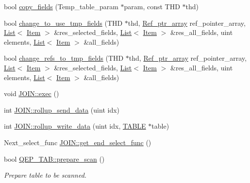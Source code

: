 \begin{DoxyCompactItemize}
\item 
bool \mbox{\hyperlink{group__Query__Executor_ga6ae2b33e35bb51f5250fac64ee0d231b}{copy\+\_\+fields}} (Temp\+\_\+table\+\_\+param $\ast$param, const T\+HD $\ast$thd)
\item 
bool \mbox{\hyperlink{group__Query__Executor_ga1e985adce1ee0b0c97f2351330ba0b45}{change\+\_\+to\+\_\+use\+\_\+tmp\+\_\+fields}} (T\+HD $\ast$thd, \mbox{\hyperlink{classBounds__checked__array}{Ref\+\_\+ptr\+\_\+array}} ref\+\_\+pointer\+\_\+array, \mbox{\hyperlink{classList}{List}}$<$ \mbox{\hyperlink{classItem}{Item}} $>$ \&res\+\_\+selected\+\_\+fields, \mbox{\hyperlink{classList}{List}}$<$ \mbox{\hyperlink{classItem}{Item}} $>$ \&res\+\_\+all\+\_\+fields, uint elements, \mbox{\hyperlink{classList}{List}}$<$ \mbox{\hyperlink{classItem}{Item}} $>$ \&all\+\_\+fields)
\item 
bool \mbox{\hyperlink{group__Query__Executor_gae27d7837289ad61f55a8649b343d2ffe}{change\+\_\+refs\+\_\+to\+\_\+tmp\+\_\+fields}} (T\+HD $\ast$thd, \mbox{\hyperlink{classBounds__checked__array}{Ref\+\_\+ptr\+\_\+array}} ref\+\_\+pointer\+\_\+array, \mbox{\hyperlink{classList}{List}}$<$ \mbox{\hyperlink{classItem}{Item}} $>$ \&res\+\_\+selected\+\_\+fields, \mbox{\hyperlink{classList}{List}}$<$ \mbox{\hyperlink{classItem}{Item}} $>$ \&res\+\_\+all\+\_\+fields, uint elements, \mbox{\hyperlink{classList}{List}}$<$ \mbox{\hyperlink{classItem}{Item}} $>$ \&all\+\_\+fields)
\item 
void \mbox{\hyperlink{group__Query__Executor_ga31581f58624b85919d7c6cd632157929}{J\+O\+I\+N\+::exec}} ()
\item 
int \mbox{\hyperlink{group__Query__Executor_ga148b2123bee3ebd0718d334e9f109db8}{J\+O\+I\+N\+::rollup\+\_\+send\+\_\+data}} (uint idx)
\item 
int \mbox{\hyperlink{group__Query__Executor_ga15c9baf548fef3d59f993a3c13575593}{J\+O\+I\+N\+::rollup\+\_\+write\+\_\+data}} (uint idx, \mbox{\hyperlink{structTABLE}{T\+A\+B\+LE}} $\ast$table)
\item 
Next\+\_\+select\+\_\+func \mbox{\hyperlink{group__Query__Executor_ga8a8f8266528e6e4f33f31333f5f3cd8a}{J\+O\+I\+N\+::get\+\_\+end\+\_\+select\+\_\+func}} ()
\item 
bool \mbox{\hyperlink{group__Query__Executor_ga0f7e9ff5a681a6bcc59e6e1f9af62b76}{Q\+E\+P\+\_\+\+T\+A\+B\+::prepare\+\_\+scan}} ()
\begin{DoxyCompactList}\small\item\em Prepare table to be scanned. \end{DoxyCompactList}\item 

\end{DoxyCompactItemize}
